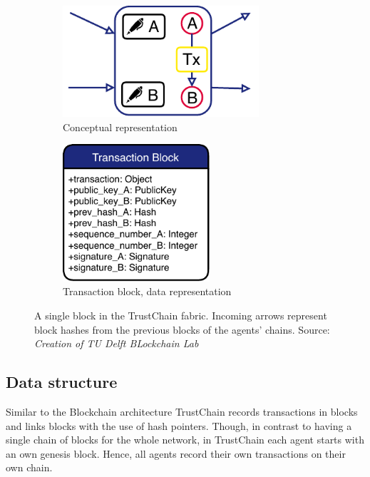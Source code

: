 \begin{figure}
    \centering
    \begin{subfigure}{0.49\textwidth}
        \centering
        \includegraphics[width=0.8\textwidth]{images/block-2.pdf}
        \caption{Conceptual representation}
    \end{subfigure}
    \begin{subfigure}{0.49\textwidth}
        \centering
        \includegraphics[width=0.6\textwidth]{images/transaction_block_data.pdf}
        \caption{Transaction block, data representation}
    \end{subfigure}
    \caption{A single block in the TrustChain fabric. Incoming arrows represent block hashes from the previous blocks of the agents' chains. Source: \textit{Creation of TU Delft BLockchain Lab}}
    \label{fig:trustchain_block}
\end{figure}

\subsection{Data structure}
\label{sec:transaction_blocks}
Similar to the Blockchain architecture TrustChain records transactions in blocks and links blocks 
with the use of hash pointers. Though, in contrast to having a single chain of blocks for the whole
network, in TrustChain each agent starts with an own genesis block. Hence, all agents record their
own transactions on their own chain. 


